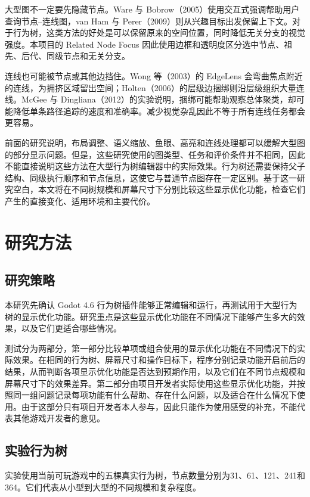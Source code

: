 \documentclass[11pt,a4paper,oneside,extrafontsizes]{memoir}
\begin{document}
大型图不一定要先隐藏节点。Ware 与 Bobrow（2005）使用交互式强调帮助用户查询节点–连线图，van Ham 与 Perer（2009）则从兴趣目标出发保留上下文。对于行为树，这类方法的好处是可以保留原来的空间位置，同时降低无关分支的视觉强度。本项目的 Related Node Focus 因此使用边框和透明度区分选中节点、祖先、后代、同级节点和无关分支。

连线也可能被节点或其他边挡住。Wong 等（2003）的 EdgeLens 会弯曲焦点附近的连线，为拥挤区域留出空间；Holten（2006）的层级边捆绑则沿层级组织大量连线。McGee 与 Dingliana（2012）的实验说明，捆绑可能帮助观察总体聚类，却可能降低单条路径追踪的速度和准确率。减少视觉杂乱因此不等于所有连线任务都会更容易。

前面的研究说明，布局调整、语义缩放、鱼眼、高亮和连线处理都可以缓解大型图的部分显示问题。但是，这些研究使用的图类型、任务和评价条件并不相同，因此不能直接说明这些方法在大型行为树编辑器中的实际效果。行为树还需要保持父子结构、同级执行顺序和节点信息，这使它与普通节点图存在一定区别。基于这一研究空白，本文将在不同树规模和屏幕尺寸下分别比较这些显示优化功能，检查它们产生的直接变化、适用环境和主要代价。

\chapter{研究方法}

\section{研究策略}

本研究先确认 Godot 4.6 行为树插件能够正常编辑和运行，再测试用于大型行为树的显示优化功能。研究重点是这些显示优化功能在不同情况下能够产生多大的效果，以及它们更适合哪些情况。

测试分为两部分，第一部分比较单项或组合使用的显示优化功能在不同情况下的实际效果。在相同的行为树、屏幕尺寸和操作目标下，程序分别记录功能开启前后的结果，从而判断各项显示优化功能是否达到预期作用，以及它们在不同节点规模和屏幕尺寸下的效果差异。第二部分由项目开发者实际使用这些显示优化功能，并按照同一组问题记录每项功能有什么帮助、存在什么问题，以及适合在什么情况下使用。由于这部分只有项目开发者本人参与，因此只能作为使用感受的补充，不能代表其他游戏开发者的意见。

\section{实验行为树}

实验使用当前可玩游戏中的五棵真实行为树，节点数量分别为31、61、121、241和364。它们代表从小型到大型的不同规模和复杂程度。
\end{document}
